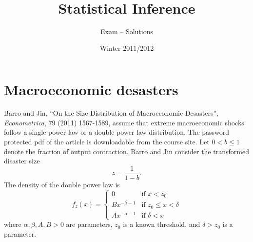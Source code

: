 \documentclass{article}
\begin{document}
\title{Statistical Inference}
\author{Exam -- Solutions}
\date{Winter 2011/2012}
\maketitle

\section{Macroeconomic desasters}

Barro and Jin, \textquotedblleft On the Size Distribution of Macroeconomic
Desasters\textquotedblright , \emph{Econometrica}, 79 (2011) 1567-1589,
assume that extreme macroeconomic shocks follow a single power law or a
double power law distribution. The password protected pdf of the article is
downloadable from the course site. Let $0<b\leq 1$ denote the fraction of
output contraction. Barro and Jin consider the transformed disaster size%
\begin{equation}
z=\frac{1}{1-b}.  \label{e1}
\end{equation}%
The density of the double power law is%
\begin{equation*}
f_{z}(x)=\left\{ 
\begin{array}{ll}
0 & \text{if }x<z_{0} \\ 
Bx^{-\beta -1} & \text{if }z_{0}\leq x<\delta  \\ 
Ax^{-\alpha -1} & \text{if }\delta <x%
\end{array}%
\right. 
\end{equation*}%
where $\alpha ,\beta ,A,B>0$ are parameters, $z_{0}$ is a known threshold,
and $\delta >z_{0}$ is a parameter.
\end{document}
